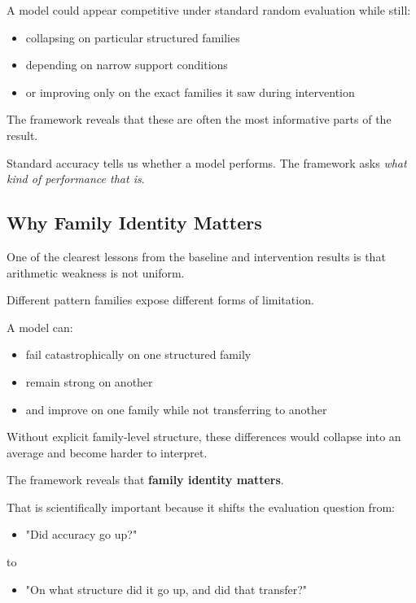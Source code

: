 \documentclass[11pt]{article}
\begin{document}
A model could appear competitive under standard random evaluation while still:
\begin{itemize}[leftmargin=1.5em]
    \item collapsing on particular structured families
    \item depending on narrow support conditions
    \item or improving only on the exact families it saw during intervention
\end{itemize}

The framework reveals that these are often the most informative parts of the result.

Standard accuracy tells us whether a model performs.
The framework asks \emph{what kind of performance that is}.

\subsection{Why Family Identity Matters}

One of the clearest lessons from the baseline and intervention results is that arithmetic weakness is not uniform.

Different pattern families expose different forms of limitation.

A model can:
\begin{itemize}[leftmargin=1.5em]
    \item fail catastrophically on one structured family
    \item remain strong on another
    \item and improve on one family while not transferring to another
\end{itemize}

Without explicit family-level structure, these differences would collapse into an average and become harder to interpret.

The framework reveals that \textbf{family identity matters}.

That is scientifically important because it shifts the evaluation question from:
\begin{itemize}[leftmargin=1.5em]
    \item "Did accuracy go up?"
\end{itemize}
to
\begin{itemize}[leftmargin=1.5em]
    \item "On what structure did it go up, and did that transfer?"
\end{itemize}
\end{document}
